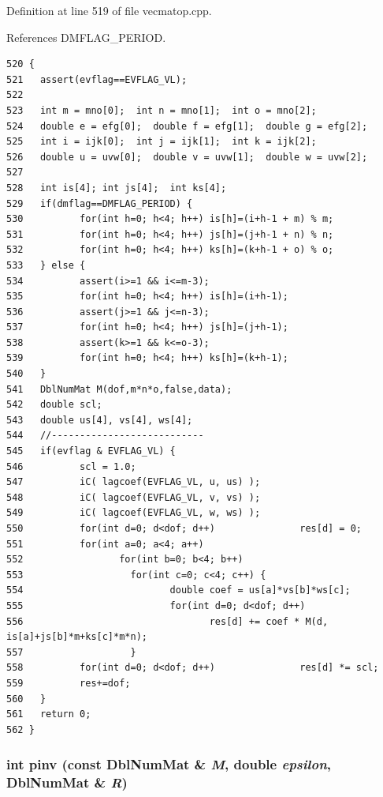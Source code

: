 Definition at line 519 of file vecmatop.cpp.

References DMFLAG\_\-PERIOD.

\footnotesize\begin{verbatim}520 {
521   assert(evflag==EVFLAG_VL);
522   
523   int m = mno[0];  int n = mno[1];  int o = mno[2];
524   double e = efg[0];  double f = efg[1];  double g = efg[2];
525   int i = ijk[0];  int j = ijk[1];  int k = ijk[2];
526   double u = uvw[0];  double v = uvw[1];  double w = uvw[2];
527   
528   int is[4]; int js[4];  int ks[4];
529   if(dmflag==DMFLAG_PERIOD) {
530          for(int h=0; h<4; h++) is[h]=(i+h-1 + m) % m;
531          for(int h=0; h<4; h++) js[h]=(j+h-1 + n) % n;
532          for(int h=0; h<4; h++) ks[h]=(k+h-1 + o) % o;
533   } else {
534          assert(i>=1 && i<=m-3);
535          for(int h=0; h<4; h++) is[h]=(i+h-1);
536          assert(j>=1 && j<=n-3);
537          for(int h=0; h<4; h++) js[h]=(j+h-1);
538          assert(k>=1 && k<=o-3);
539          for(int h=0; h<4; h++) ks[h]=(k+h-1);
540   }
541   DblNumMat M(dof,m*n*o,false,data);
542   double scl; 
543   double us[4], vs[4], ws[4];
544   //---------------------------
545   if(evflag & EVFLAG_VL) {
546          scl = 1.0;
547          iC( lagcoef(EVFLAG_VL, u, us) );
548          iC( lagcoef(EVFLAG_VL, v, vs) );
549          iC( lagcoef(EVFLAG_VL, w, ws) );
550          for(int d=0; d<dof; d++)               res[d] = 0;
551          for(int a=0; a<4; a++)
552                 for(int b=0; b<4; b++)
553                   for(int c=0; c<4; c++) {
554                          double coef = us[a]*vs[b]*ws[c]; 
555                          for(int d=0; d<dof; d++)
556                                 res[d] += coef * M(d, is[a]+js[b]*m+ks[c]*m*n);
557                   }
558          for(int d=0; d<dof; d++)               res[d] *= scl;
559          res+=dof;
560   }
561   return 0;
562 }
\end{verbatim}\normalsize 


\subsubsection{\setlength{\rightskip}{0pt plus 5cm}int pinv (const {\bf Dbl\-Num\-Mat} \& {\em M}, double {\em epsilon}, {\bf Dbl\-Num\-Mat} \& {\em R})}\label{vecmatop_8cpp_e6044a83323bd043a807de27d79c4365_e6044a83323bd043a807de27d79c4365}




